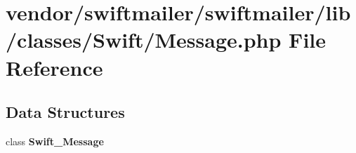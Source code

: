 \section{vendor/swiftmailer/swiftmailer/lib/classes/\+Swift/\+Message.php File Reference}
\label{swiftmailer_2swiftmailer_2lib_2classes_2_swift_2_message_8php}
\subsection*{Data Structures}
\begin{DoxyCompactItemize}
\item 
class {\bf Swift\+\_\+\+Message}
\end{DoxyCompactItemize}
